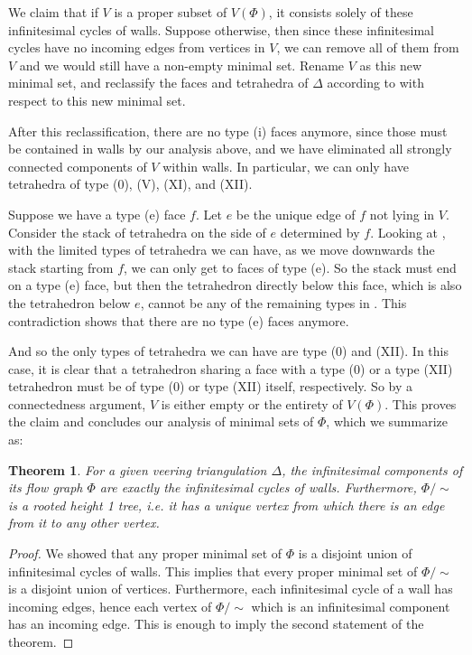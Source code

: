 \documentclass[12pt]{amsart}
\newtheorem{thm}{Theorem}[section]
\theoremstyle{definition}
\numberwithin{equation}{section}
\begin{document}
We claim that if $V$ is a proper subset of $V(\Phi)$, it consists solely of these infinitesimal cycles of walls. Suppose otherwise, then since these infinitesimal cycles have no incoming edges from vertices in $V$, we can remove all of them from $V$ and we would still have a non-empty minimal set. Rename $V$ as this new minimal set, and reclassify the faces and tetrahedra of $\Delta$ according to  with respect to this new minimal set.

After this reclassification, there are no type (i) faces anymore, since those must be contained in walls by our analysis above, and we have eliminated all strongly connected components of $V$ within walls. In particular, we can only have tetrahedra of type (0), (V), (XI), and (XII).

Suppose we have a type (e) face $f$. Let $e$ be the unique edge of $f$ not lying in $V$. Consider the stack of tetrahedra on the side of $e$ determined by $f$. Looking at , with the limited types of tetrahedra we can have, as we move downwards the stack starting from $f$, we can only get to faces of type (e). So the stack must end on a type (e) face, but then the tetrahedron directly below this face, which is also the tetrahedron below $e$, cannot be any of the remaining types in . This contradiction shows that there are no type (e) faces anymore.

And so the only types of tetrahedra we can have are type (0) and (XII). In this case, it is clear that a tetrahedron sharing a face with a type (0) or a type (XII) tetrahedron must be of type (0) or type (XII) itself, respectively. So by a connectedness argument, $V$ is either empty or the entirety of $V(\Phi)$. This proves the claim and concludes our analysis of minimal sets of $\Phi$, which we summarize as:

\begin{thm} \label{thm:infinitesimal}
For a given veering triangulation $\Delta$, the infinitesimal components of its flow graph $\Phi$ are exactly the infinitesimal cycles of walls. Furthermore, $\Phi/{\sim}$ is a rooted height 1 tree, i.e. it has a unique vertex from which there is an edge from it to any other vertex.
\end{thm}

\begin{proof}
We showed that any proper minimal set of $\Phi$ is a disjoint union of infinitesimal cycles of walls. This implies that every proper minimal set of $\Phi/{\sim}$ is a disjoint union of vertices. Furthermore, each infinitesimal cycle of a wall has incoming edges, hence each vertex of $\Phi/{\sim}$ which is an infinitesimal component has an incoming edge. This is enough to imply the second statement of the theorem.
\end{proof}
\end{document}
